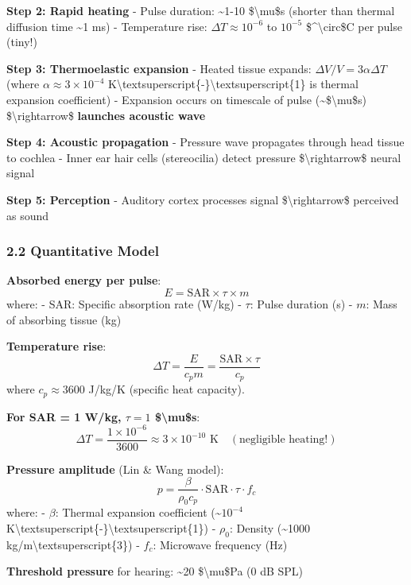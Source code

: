 \textbf{Step 2: Rapid heating} - Pulse duration: \textasciitilde1-10
\$\textbackslash mu\$s (shorter than thermal diffusion time
\textasciitilde1 ms) - Temperature rise: \(\Delta T \approx 10^{-6}\) to
\(10^{-5}\) \$\^{}\textbackslash circ\$C per pulse (tiny!)

\textbf{Step 3: Thermoelastic expansion} - Heated tissue expands:
\(\Delta V/V = 3\alpha \Delta T\) (where
\(\alpha \approx 3 \times 10^{-4}\)
K\textbackslash textsuperscript\{-\}\textbackslash textsuperscript\{1\}
is thermal expansion coefficient) - Expansion occurs on timescale of
pulse (\textasciitilde\$\textbackslash mu\$s)
\$\textbackslash rightarrow\$ \textbf{launches acoustic wave}

\textbf{Step 4: Acoustic propagation} - Pressure wave propagates through
head tissue to cochlea - Inner ear hair cells (stereocilia) detect
pressure \$\textbackslash rightarrow\$ neural signal

\textbf{Step 5: Perception} - Auditory cortex processes signal
\$\textbackslash rightarrow\$ perceived as sound

\subsubsection{2.2 Quantitative Model}\label{quantitative-model}

\textbf{Absorbed energy per pulse}:
\[E = \text{SAR} \times \tau \times m\] where: - SAR: Specific
absorption rate (W/kg) - \(\tau\): Pulse duration (s) - \(m\): Mass of
absorbing tissue (kg)

\textbf{Temperature rise}:
\[\Delta T = \frac{E}{c_p m} = \frac{\text{SAR} \times \tau}{c_p}\]
where \(c_p \approx 3600\) J/kg/K (specific heat capacity).

\textbf{For SAR = 1 W/kg, \(\tau = 1\) \$\textbackslash mu\$s}:
\[\Delta T = \frac{1 \times 10^{-6}}{3600} \approx 3 \times 10^{-10} \text{ K} \quad (\text{negligible heating!})\]

\textbf{Pressure amplitude} (Lin \& Wang model):
\[p = \frac{\beta}{\rho_0 c_p} \cdot \text{SAR} \cdot \tau \cdot f_c\]
where: - \(\beta\): Thermal expansion coefficient
(\textasciitilde{}\(10^{-4}\)
K\textbackslash textsuperscript\{-\}\textbackslash textsuperscript\{1\})
- \(\rho_0\): Density (\textasciitilde1000
kg/m\textbackslash textsuperscript\{3\}) - \(f_c\): Microwave frequency
(Hz)

\textbf{Threshold pressure} for hearing: \textasciitilde20
\$\textbackslash mu\$Pa (0 dB SPL)

